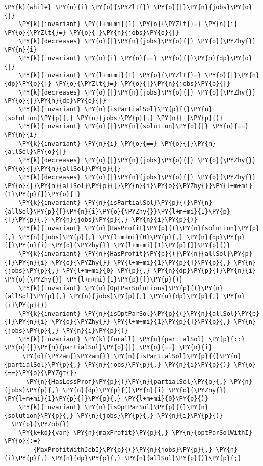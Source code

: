 \begin{Verbatim}[commandchars=\\\{\}, fontsize=\footnotesize]
  \PY{k}{while} \PY{n}{i} \PY{o}{\PYZlt{}} \PY{o}{|}\PY{n}{jobs}\PY{o}{|}
    \PY{k}{invariant} \PY{l+m+mi}{1} \PY{o}{\PYZlt{}=} \PY{n}{i} \PY{o}{\PYZlt{}=} \PY{o}{|}\PY{n}{jobs}\PY{o}{|}
    \PY{k}{decreases} \PY{o}{|}\PY{n}{jobs}\PY{o}{|} \PY{o}{\PYZhy{}} \PY{n}{i}
    \PY{k}{invariant} \PY{n}{i} \PY{o}{==} \PY{o}{|}\PY{n}{dp}\PY{o}{|}
    \PY{k}{invariant} \PY{l+m+mi}{1} \PY{o}{\PYZlt{}=} \PY{o}{|}\PY{n}{dp}\PY{o}{|} \PY{o}{\PYZlt{}=} \PY{o}{|}\PY{n}{jobs}\PY{o}{|}
    \PY{k}{decreases} \PY{o}{|}\PY{n}{jobs}\PY{o}{|} \PY{o}{\PYZhy{}} \PY{o}{|}\PY{n}{dp}\PY{o}{|}
    \PY{k}{invariant} \PY{n}{isPartialSol}\PY{p}{(}\PY{n}{solution}\PY{p}{,} \PY{n}{jobs}\PY{p}{,} \PY{n}{i}\PY{p}{)}
    \PY{k}{invariant} \PY{o}{|}\PY{n}{solution}\PY{o}{|} \PY{o}{==} \PY{n}{i}
    \PY{k}{invariant} \PY{n}{i} \PY{o}{==} \PY{o}{|}\PY{n}{allSol}\PY{o}{|}
    \PY{k}{decreases} \PY{o}{|}\PY{n}{jobs}\PY{o}{|} \PY{o}{\PYZhy{}} \PY{o}{|}\PY{n}{allSol}\PY{o}{|}
    \PY{k}{decreases} \PY{o}{|}\PY{n}{jobs}\PY{o}{|} \PY{o}{\PYZhy{}} \PY{o}{|}\PY{n}{allSol}\PY{p}{[}\PY{n}{i}\PY{o}{\PYZhy{}}\PY{l+m+mi}{1}\PY{p}{]}\PY{o}{|}
    \PY{k}{invariant} \PY{n}{isPartialSol}\PY{p}{(}\PY{n}{allSol}\PY{p}{[}\PY{n}{i}\PY{o}{\PYZhy{}}\PY{l+m+mi}{1}\PY{p}{]}\PY{p}{,} \PY{n}{jobs}\PY{p}{,} \PY{n}{i}\PY{p}{)}
    \PY{k}{invariant} \PY{n}{HasProfit}\PY{p}{(}\PY{n}{solution}\PY{p}{,} \PY{n}{jobs}\PY{p}{,} \PY{l+m+mi}{0}\PY{p}{,} \PY{n}{dp}\PY{p}{[}\PY{n}{i} \PY{o}{\PYZhy{}} \PY{l+m+mi}{1}\PY{p}{]}\PY{p}{)}
    \PY{k}{invariant} \PY{n}{HasProfit}\PY{p}{(}\PY{n}{allSol}\PY{p}{[}\PY{n}{i} \PY{o}{\PYZhy{}} \PY{l+m+mi}{1}\PY{p}{]}\PY{p}{,} \PY{n}{jobs}\PY{p}{,} \PY{l+m+mi}{0} \PY{p}{,} \PY{n}{dp}\PY{p}{[}\PY{n}{i} \PY{o}{\PYZhy{}} \PY{l+m+mi}{1}\PY{p}{]}\PY{p}{)}
    \PY{k}{invariant} \PY{n}{OptParSolutions}\PY{p}{(}\PY{n}{allSol}\PY{p}{,} \PY{n}{jobs}\PY{p}{,} \PY{n}{dp}\PY{p}{,} \PY{n}{i}\PY{p}{)}
    \PY{k}{invariant} \PY{n}{isOptParSol}\PY{p}{(}\PY{n}{allSol}\PY{p}{[}\PY{n}{i} \PY{o}{\PYZhy{}} \PY{l+m+mi}{1}\PY{p}{]}\PY{p}{,} \PY{n}{jobs}\PY{p}{,} \PY{n}{i}\PY{p}{)}
    \PY{k}{invariant} \PY{k}{forall} \PY{n}{partialSol} \PY{p}{::} \PY{o}{|}\PY{n}{partialSol}\PY{o}{|} \PY{o}{==} \PY{n}{i} 
     \PY{o}{\PYZam{}\PYZam{}} \PY{n}{isPartialSol}\PY{p}{(}\PY{n}{partialSol}\PY{p}{,} \PY{n}{jobs}\PY{p}{,} \PY{n}{i}\PY{p}{)} \PY{o}{==}\PY{o}{\PYZgt{}}
      \PY{n}{HasLessProf}\PY{p}{(}\PY{n}{partialSol}\PY{p}{,} \PY{n}{jobs}\PY{p}{,} \PY{n}{dp}\PY{p}{[}\PY{n}{i} \PY{o}{\PYZhy{}} \PY{l+m+mi}{1}\PY{p}{]}\PY{p}{,} \PY{l+m+mi}{0}\PY{p}{)}
    \PY{k}{invariant} \PY{n}{isOptParSol}\PY{p}{(}\PY{n}{solution}\PY{p}{,} \PY{n}{jobs}\PY{p}{,} \PY{n}{i}\PY{p}{)}
  \PY{p}{\PYZob{}}
    \PY{k+kd}{var} \PY{n}{maxProfit}\PY{p}{,} \PY{n}{optParSolWithI} \PY{o}{:=} 
        {MaxProfitWithJobI}\PY{p}{(}\PY{n}{jobs}\PY{p}{,} \PY{n}{i}\PY{p}{,} \PY{n}{dp}\PY{p}{,} \PY{n}{allSol}\PY{p}{)}\PY{p}{;}
    

\end{Verbatim}
